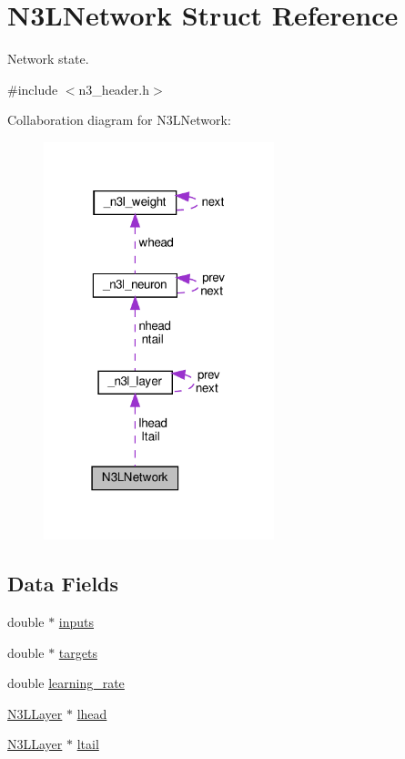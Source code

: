 \hypertarget{structN3LNetwork}{}\section{N3\+L\+Network Struct Reference}
\label{structN3LNetwork}


Network state.  




{\ttfamily \#include $<$n3\+\_\+header.\+h$>$}



Collaboration diagram for N3\+L\+Network\+:
\nopagebreak
\begin{figure}[H]
\begin{center}
\leavevmode
\includegraphics[width=190pt]{structN3LNetwork__coll__graph}
\end{center}
\end{figure}
\subsection*{Data Fields}
\begin{DoxyCompactItemize}
\item 
double $\ast$ \hyperlink{structN3LNetwork_a45ff5bcae18502559925aba0cbd0313b}{inputs}
\item 
double $\ast$ \hyperlink{structN3LNetwork_aba0f6767a66173743840b7c9fa919daf}{targets}
\item 
double \hyperlink{structN3LNetwork_ae7c5e2ed74786685185cf2cbb955bf51}{learning\+\_\+rate}
\item 
\hyperlink{n3__header_8h_a9ee3a7104816bdb6222148cfe9ca8ad9}{N3\+L\+Layer} $\ast$ \hyperlink{structN3LNetwork_ae77d4b7deecdc3c9590a4112689db2f8}{lhead}
\item 
\hyperlink{n3__header_8h_a9ee3a7104816bdb6222148cfe9ca8ad9}{N3\+L\+Layer} $\ast$ \hyperlink{structN3LNetwork_a758fd06b3dda29e064ccd4bc4d27e1c3}{ltail}
\end{DoxyCompactItemize}


